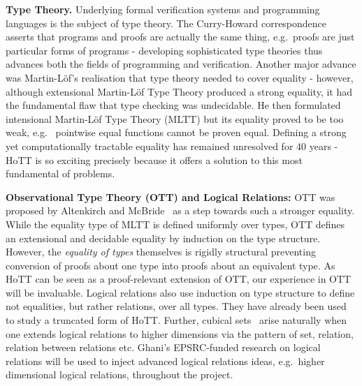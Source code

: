 \documentclass[a4paper,11pt]{article}
\newcommand{\eg}{{e.g.}\ }
\begin{document}
{\bf Type Theory.} Underlying formal verification systems and
programming languages is the subject of type theory. The
Curry-Howard correspondence asserts that programs and proofs are
actually the same thing, \eg proofs are just particular forms of
programs - developing sophisticated type theories thus advances both 
the fields of programming and verification. Another
major advance was Martin-L\"of's realisation that type theory needed
to cover equality - however, although 
extensional Martin-L\"of Type Theory produced
a strong equality, it had the fundamental flaw that type
checking was undecidable. He then formulated intensional Martin-L\"of
Type Theory (MLTT) but its equality proved to be too weak, \eg
pointwise equal functions cannot be proven equal. Defining a strong yet
computationally tractable equality has remained unresolved for 40
years - HoTT is so exciting precisely because it offers a
solution to this most fundamental of problems.

{\bf Observational Type Theory (OTT) and Logical Relations:} OTT was
proposed by Altenkirch and McBride~\cite{alti:ott-conf} as a step
towards such a stronger equality. While the equality type of MLTT is
defined uniformly over types, OTT defines an extensional and
decidable equality by induction on the type structure. However, the
{\em equality of types} themselves is rigidly structural preventing 
conversion of proofs about one type into proofs about an equivalent type. As
HoTT can be seen as a proof-relevant extension of OTT, our experience
in OTT will be invaluable.
Logical relations also use induction on type structure
to define not equalities, but rather relations, over all
types. They have already been
used~\cite{licataHarper:canonicity2d} to study a truncated form of
HoTT. Further, cubical sets~\cite{BezemM:cubsmt} 
arise naturally when one extends logical
relations to higher dimensions via the pattern of set, relation,
relation between relations etc. Ghani's EPSRC-funded research on
logical relations will be used to inject advanced logical relations
ideas, \eg higher dimensional logical relations, throughout
the project.




\end{document}
